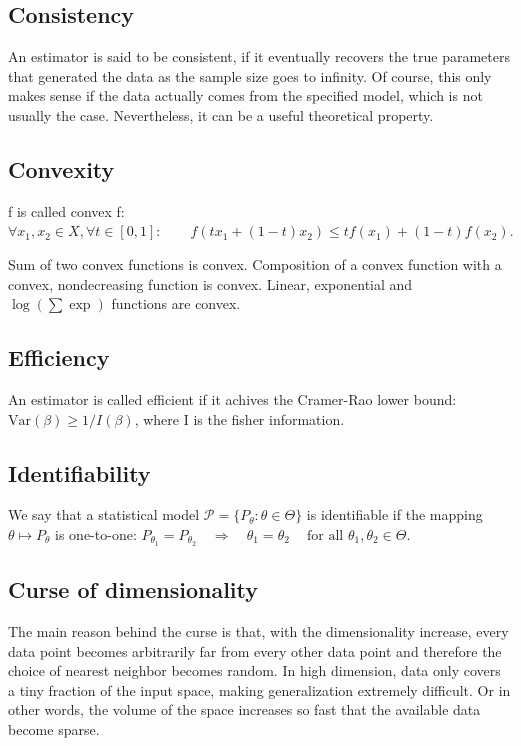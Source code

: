 \documentclass[10pt,a4paper,landscape]{article}
\newcommand{\Var}{\mathrm{Var}}
\begin{document}
\begin{multicols*}{4}
\subsection{Consistency}
An estimator is said to be consistent, if it eventually recovers the true parameters that generated the data as the sample size goes to infinity. Of course, this only makes sense if the data actually comes from the specified model, which is not usually the case. Nevertheless, it can be a useful theoretical property.

\subsection{Convexity}
f is called convex f: $\forall x_1, x_2 \in X, \forall t \in [0, 1]: \qquad f(tx_1+(1-t)x_2)\leq t f(x_1)+(1-t)f(x_2).$

Sum of two convex functions is convex. Composition of a convex function with a convex, nondecreasing function is convex. Linear, exponential and $\log(\sum \exp)$ functions are convex.

\subsection{Efficiency}
An estimator is called efficient if it achives the Cramer-Rao lower bound:
$\Var{(\beta)} \geq 1/I(\beta)$, where I is the fisher information.

\subsection{Identifiability}
We say that a statistical model $\mathcal{P} = \{P_\theta: \theta \in \Theta\}$ is identifiable if the mapping $\theta \mapsto P_\theta$ is one-to-one:
$P_{\theta_1}=P_{\theta_2} \quad\Rightarrow\quad \theta_1=\theta_2 \quad\ \text{for all } \theta_1,\theta_2\in\Theta.$


\subsection{Curse of dimensionality}
The main reason behind the curse is that, with the dimensionality increase, every data point becomes arbitrarily far
from every other data point and therefore the choice of nearest neighbor becomes random.
In high dimension, data only covers a tiny fraction of the input space, making generalization extremely difficult.
Or in other words, the volume of the space increases so fast that the available data become sparse.


\end{multicols*}
\end{document}
